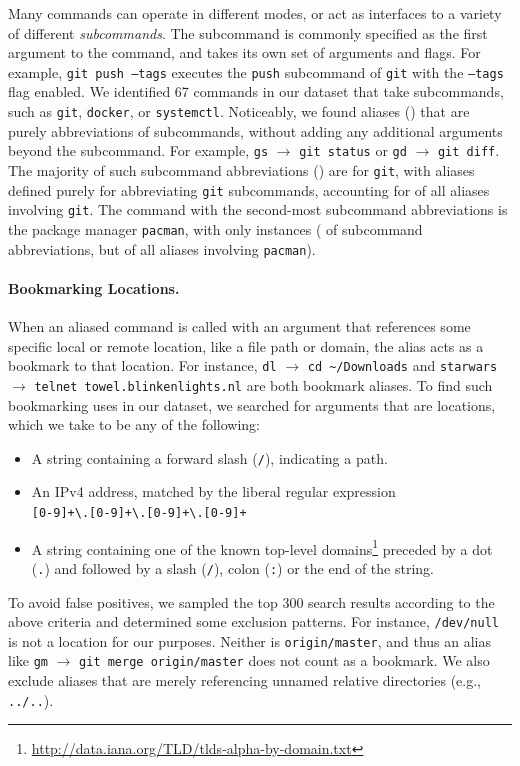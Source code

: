 \documentclass[sigconf,nonacm,screen]{acmart}
\newcommand{\num}[1]{\numprint{#1}}
\newcommand{\per}[1]{\numprint[\%]{#1}}
\newcommand{\alias}[2]{{\texttt{#1} $\rightarrow$ \texttt{#2}}}
\newcommand{\cmd}[1]{{\texttt{#1}}}
\begin{document}
Many commands can operate in different modes, or act as interfaces to a variety of different \emph{subcommands}.
The subcommand is commonly specified as the first argument to the command, and takes its own set of arguments and flags.
For example, \texttt{git push --tags} executes the \texttt{push} subcommand of \cmd{git} with the \texttt{--tags} flag enabled.
We identified 67 commands in our dataset that take subcommands, such as \cmd{git}, \cmd{docker}, or \cmd{systemctl}.
Noticeably, we found \num{194850} aliases (\per{8.84}) that are purely abbreviations of subcommands, without adding any additional arguments beyond the subcommand.
For example, \alias{gs}{git~status} or \alias{gd}{git diff}.
The majority of such subcommand abbreviations (\per{58.5}) are for \cmd{git}, with \num{113980} aliases defined purely for abbreviating \cmd{git} subcommands, accounting for \per{36.77} of all aliases involving \cmd{git}.
The command with the second-most subcommand abbreviations is the package manager \cmd{pacman}, with only \num{9918} instances (\per{5.09} of subcommand abbreviations, but \per{68.67} of all aliases involving \cmd{pacman}).

\paragraph{\bf Bookmarking Locations.}

When an aliased command is called with an argument that references some specific local or remote location, like a file path or domain, the alias acts as a bookmark to that location.
For instance, \alias{dl}{cd \textasciitilde/Downloads} and \alias{starwars}{telnet towel.blinkenlights.nl} are both bookmark aliases.
To find such bookmarking uses in our dataset, we searched for arguments that are locations, which we take to be any of the following:
\begin{itemize}
    \item A string containing a forward slash (\verb|/|), indicating a path.
    \item An IPv4 address, matched by the liberal regular expression\\\verb|[0-9]+\.[0-9]+\.[0-9]+\.[0-9]+|
    \item A string containing one of the known top-level domains\footnote{\url{http://data.iana.org/TLD/tlds-alpha-by-domain.txt}} preceded by a dot (\verb|.|) and followed by a slash (\verb|/|), colon (\verb|:|) or the end of the string.
\end{itemize}
To avoid false positives, we sampled the top 300 search results according to the above criteria and determined some exclusion patterns.
For instance, \texttt{/dev/null} is not a location for our purposes.
Neither is \texttt{origin/master}, and thus an alias like \alias{gm}{git~merge~origin/master} does not count as a bookmark.
We also exclude aliases that are merely referencing unnamed relative directories (e.g., \verb|../..|).
\end{document}
